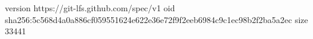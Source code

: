 version https://git-lfs.github.com/spec/v1
oid sha256:5c568d4a0a886cf059551624e622e36e72f9f2eeb6984c9c1ec98b2f2ba5a2ec
size 33441
